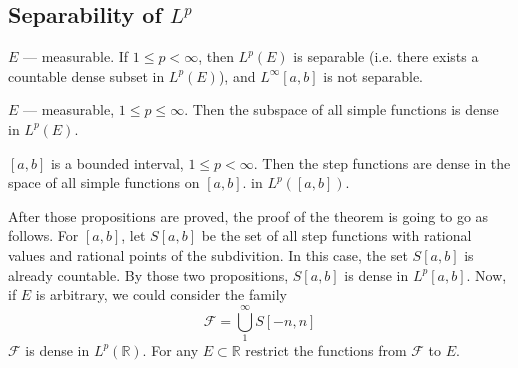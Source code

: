 \subsection{Separability of $L^p$}
\begin{theorem}
    $E$ --- measurable. If $1 \le p < \infty$, then $L^p(E)$ is separable
    (i.e. there exists a countable dense subset in $L^p(E)$),
    and $L^\infty[a, b]$ is not separable.
\end{theorem}
\begin{proposition}
    \label{prop:propOneSeparability}
    $E$ --- measurable, $1 \le p \le \infty$. Then the subspace of all simple functions is
    dense in $L^p(E)$.
\end{proposition}
\begin{proposition}
    \label{prop:propTwoSeparability}
    $[a, b]$ is a bounded interval, $1 \le p < \infty$. Then the step functions
    are dense in the space of all simple functions on $[a, b]$.
    in $L^p([a, b])$.
\end{proposition}

After those propositions are proved, the proof of the theorem is going to go as follows.
For $[a, b]$, let $S[a, b]$ be the set of all step functions with rational values
and rational points of the subdivition. In this case, the set $S[a, b]$ is already countable.
By those two propositions, $S[a, b]$ is dense in $L^p[a, b]$. Now, if $E$ is arbitrary, 
we could consider the family 
\[ \mathcal{F} = \bigcup_1^\infty S[-n, n] \]
$\mathcal{F}$ is dense in $L^p(\mathbb{R})$.
For any $E \subset \mathbb{R}$ restrict the functions from
$\mathcal{F}$ to $E$.
